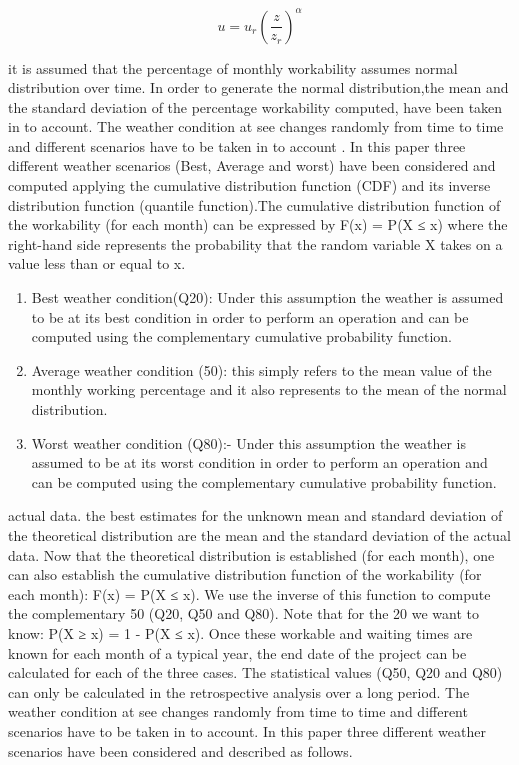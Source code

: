 \begin{equation}
\label{eqn:windprofile}
u = u_{r} \left( \frac{z}{z_r} \right)^{\alpha}
\end{equation}

it is assumed that the percentage of monthly workability assumes normal distribution over time. In order to  generate the normal distribution,the mean and the standard deviation of the percentage workability computed, have been taken in to account. The weather condition at see changes randomly from time to time and different scenarios have to be taken in to account . In this paper three different weather scenarios (Best, Average and worst) have been considered and computed applying the cumulative distribution function (CDF) and its inverse distribution function (quantile function).The cumulative distribution function of the workability (for each month) can be expressed by F(x) = P(X ≤ x) where the right-hand side represents the probability that the random variable X takes on a value less than or equal to x. 



\begin{enumerate}[label=\roman*]
\item
Best weather condition(Q20): Under this assumption the weather is assumed to be at its best condition in order to perform an operation and can be computed using the complementary cumulative probability function. 
\item
Average weather condition (50): this simply refers to the mean value of the monthly working percentage and it also represents to the mean of the normal distribution.
\item Worst weather condition (Q80):- Under this assumption the weather is assumed to be at its worst condition in order to perform an operation and can be computed using the complementary cumulative probability function. 
\end{enumerate}
actual data. the best estimates for the unknown mean and standard
deviation of the theoretical distribution are the mean and the standard deviation of the
actual data.
Now that the theoretical distribution is established (for each month), one can also establish
the cumulative distribution function of the workability (for each month): F(x) = P(X ≤ x). We
use the inverse of this function to compute the complementary 50%
(Q20, Q50 and Q80). Note that for the 20%
we want to know: P(X ≥ x) = 1 - P(X ≤ x).
Once these workable and waiting times are known for each month of a typical year, the end
date of the project can be calculated for each of the three cases.
The statistical values (Q50, Q20 and Q80) can only be calculated in the retrospective
analysis over a long period.
The weather condition at see changes randomly from time to time and different scenarios have to be taken in to account. In this paper three different weather scenarios have been considered and described as follows. 

